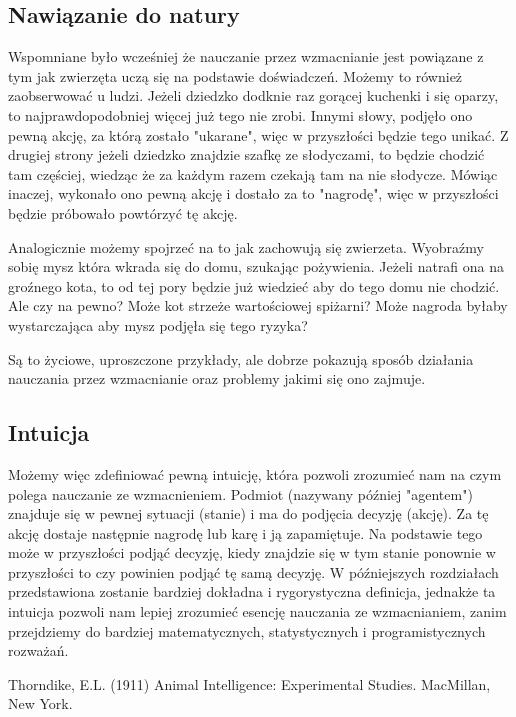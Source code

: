 \documentclass[12pt,a4paper]{article}
\begin{document}
\subsection{Nawiązanie do natury}

Wspomniane było wcześniej że nauczanie przez wzmacnianie jest powiązane z tym jak zwierzęta uczą się na podstawie doświadczeń. Możemy to również zaobserwować u ludzi. Jeżeli dziedzko dodknie raz gorącej kuchenki i się oparzy, to najprawdopodobniej więcej już tego nie zrobi. Innymi słowy, podjęło ono pewną akcję, za którą zostało "ukarane", więc w przyszłości będzie tego unikać. Z drugiej strony jeżeli dziedzko znajdzie szafkę ze słodyczami, to będzie chodzić tam częściej, wiedząc że za każdym razem czekają tam na nie słodycze. Mówiąc inaczej, wykonało ono pewną akcję i dostało za to "nagrodę", więc w przyszłości będzie próbowało powtórzyć tę akcję.

Analogicznie możemy spojrzeć na to jak zachowują się zwierzeta. Wyobraźmy sobię mysz która wkrada się do domu, szukając pożywienia. Jeżeli natrafi ona na groźnego kota, to od tej pory będzie już wiedzieć aby do tego domu nie chodzić. Ale czy na pewno? Może kot strzeże wartościowej spiżarni? Może nagroda byłaby wystarczająca aby mysz podjęła się tego ryzyka?

Są to życiowe, uproszczone przykłady, ale dobrze pokazują sposób działania nauczania przez wzmacnianie oraz problemy jakimi się ono zajmuje.

\subsection{Intuicja}

Możemy więc zdefiniować pewną intuicję, która pozwoli zrozumieć nam na czym polega nauczanie ze wzmacnieniem. Podmiot (nazywany później "agentem") znajduje się w pewnej sytuacji (stanie) i ma do podjęcia decyzję (akcję). Za tę akcję dostaje następnie nagrodę lub karę i ją zapamiętuje. Na podstawie tego może w przyszłości podjąć decyzję, kiedy znajdzie się w tym stanie ponownie w przyszłości to czy powinien podjąć tę samą decyzję.
W późniejszych rozdziałach przedstawiona zostanie bardziej dokładna i rygorystyczna definicja, jednakże ta intuicja pozwoli nam lepiej zrozumieć esencję nauczania ze wzmacnianiem, zanim przejdziemy do bardziej matematycznych, statystycznych i programistycznych rozważań.

\begin{thebibliography}{9}
Thorndike, E.L. (1911) Animal Intelligence: Experimental Studies. MacMillan, New York.
\end{thebibliography}
\end{document}
